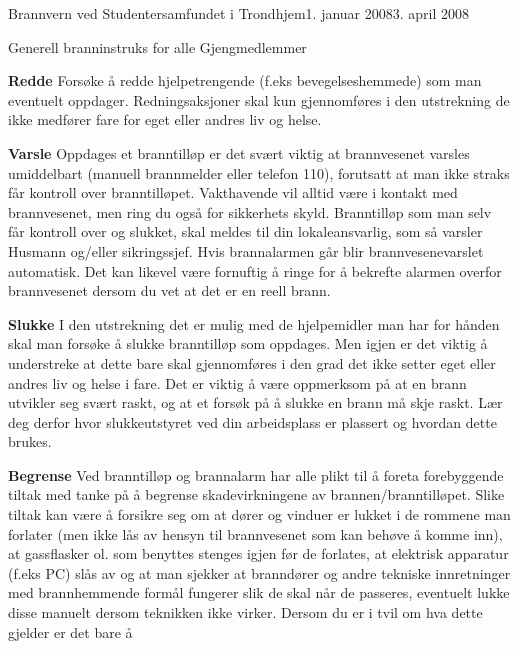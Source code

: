 \begin{instruks}{Brannvern ved Studentersamfundet i Trondhjem}{1. januar 2008}{3. april 2008}
\begin{instruksledd}{Generell branninstruks for alle Gjengmedlemmer}
    \begin{description}
        \item \textbf{Redde} Forsøke å redde hjelpetrengende (f.eks bevegelseshemmede) som man
            eventuelt oppdager. Redningsaksjoner skal kun
            gjennomføres i den utstrekning de ikke medfører fare for eget eller andres liv
            og helse.
        \item \textbf{Varsle} Oppdages et branntilløp er det svært viktig at brannvesenet varsles
            umiddelbart (manuell brannmelder eller telefon
            110), forutsatt at man ikke straks får kontroll over branntilløpet.
            Vakthavende vil alltid være i kontakt med
            brannvesenet, men ring du også for sikkerhets skyld. Branntilløp som man selv
            får kontroll over og slukket, skal
            meldes til din lokaleansvarlig, som så varsler Husmann og/eller sikringssjef.
            Hvis brannalarmen går blir brannvesenevarslet automatisk. Det kan likevel være
            fornuftig å ringe for å bekrefte alarmen overfor brannvesenet dersom du vet
            at det er en reell brann.
        \item \textbf{Slukke} I den utstrekning det er mulig med de hjelpemidler man har for hånden skal man
            forsøke å slukke branntilløp som
            oppdages. Men igjen er det viktig å understreke at dette bare skal
            gjennomføres i den grad det ikke setter eget eller
            andres liv og helse i fare. Det er viktig å være oppmerksom på at en brann
            utvikler seg svært raskt, og at et forsøk på å
            slukke en brann må skje raskt. Lær deg derfor hvor slukkeutstyret ved din
            arbeidsplass er plassert og hvordan dette
            brukes.
        \item \textbf{Begrense} Ved branntilløp og brannalarm har alle plikt til å foreta
            forebyggende tiltak med tanke på å begrense skadevirkningene
            av brannen/branntilløpet. Slike tiltak kan være å forsikre seg om at dører og
            vinduer er lukket i de rommene man
            forlater (men ikke lås av hensyn til brannvesenet som kan behøve å komme inn),
            at gassflasker ol. som benyttes
            stenges igjen før de forlates, at elektrisk apparatur (f.eks PC) slås av og at
            man sjekker at branndører og andre tekniske
            innretninger med brannhemmende formål fungerer slik de skal når de passeres,
            eventuelt lukke disse manuelt dersom
            teknikken ikke virker. Dersom du er i tvil om hva dette gjelder er det bare å

\end{description}
\end{instruksledd}
\end{instruks}
